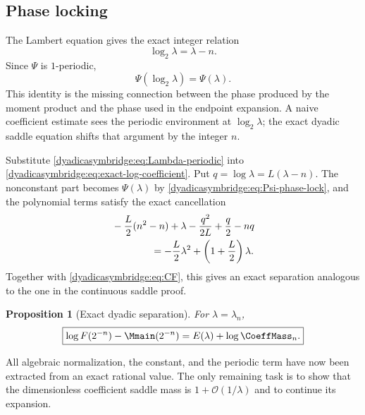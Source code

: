 \documentclass[11pt,oneside]{article}
\newtheorem{proposition}[theorem]{Proposition}
\theoremstyle{definition}
\theoremstyle{remark}
\newcommand{\bigO}{\mathcal O}
\begin{document}
\subsection{Phase locking}
\label{dyadicasymbridge:subsec:phase-locking}

The Lambert equation gives the exact integer relation
\begin{equation}
 \log_2\lambda=\lambda-n.
\label{dyadicasymbridge:eq:phase-lock}
\end{equation}
Since $\Psi$ is $1$-periodic,
\begin{equation}
 \boxed{\Psi(\log_2\lambda)=\Psi(\lambda).}
\label{dyadicasymbridge:eq:Psi-phase-lock}
\end{equation}
This identity is the missing connection between the phase produced by the moment product and the phase used in the endpoint expansion.  A naive coefficient estimate sees the periodic environment at $\log_2\lambda$; the exact dyadic saddle equation shifts that argument by the integer $n$.

Substitute \eqref{dyadicasymbridge:eq:Lambda-periodic} into \eqref{dyadicasymbridge:eq:exact-log-coefficient}.  Put
$q=\log\lambda=L(\lambda-n)$.  The nonconstant part becomes $\Psi(\lambda)$ by \eqref{dyadicasymbridge:eq:Psi-phase-lock}, and the polynomial terms satisfy the exact cancellation
\begin{align}
 &-\frac L2(n^2-n)+\lambda-
 \frac{q^2}{2L}+\frac q2-nq                         \notag\\
 &\hspace{4em}=-\frac L2\lambda^2+
 \left(1+\frac L2\right)\lambda.
\label{dyadicasymbridge:eq:key-algebra-cancellation}
\end{align}
Together with \eqref{dyadicasymbridge:eq:CF}, this gives an exact separation analogous to the one in the continuous saddle proof.

\begin{proposition}[Exact dyadic separation]
\label{dyadicasymbridge:prop:exact-dyadic-separation}
For $\lambda=\lambda_n$,
\begin{equation}
 \boxed{
 \log F(2^{-n})-\Mmain(2^{-n})
 =E(\lambda)+\log\CoeffMass_n.}
\label{dyadicasymbridge:eq:exact-dyadic-separation}
\end{equation}
\end{proposition}

All algebraic normalization, the constant, and the periodic term have now been extracted from an exact rational value.  The only remaining task is to show that the dimensionless coefficient saddle mass is $1+\bigO(1/\lambda)$ and to continue its expansion.
\end{document}
